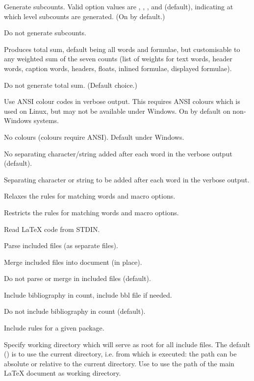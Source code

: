 \begin{description}
\option[-sub\alt{=\ldots}, -subcount\alt{=\ldots}]Generate subcounts. Valid option values are , , ,  and  (default), indicating at which level subcounts are generated. (On by default.)

\option[-nosub]Do not generate subcounts.

\option[-sum\alt{=n,n,\ldots}]Produces total sum, default being all words and formulae, but customisable to any weighted sum of the seven counts (list of weights for text words, header words, caption words, headers, floats, inlined formulae, displayed formulae).

\option[-nosum]Do not generate total sum. (Default choice.)

\option[-col]Use ANSI colour codes in verbose output. This requires ANSI colours which is used on Linux, but may not be available under Windows. On by default on non-Windows systems. 

\option[-nc, -nocol]No colours (colours require ANSI). Default under Windows.

No separating character/string added after each word in the verbose output (default).

\option[-sep=, -separator=]Separating character or string to be added after each word in the verbose output.

\option[-relaxed]Relaxes the rules for matching words and macro options.

\option[-restricted]Restricts the rules for matching words and macro options.

\option[-]Read \LaTeX{} code from STDIN.

\option[-inc]Parse included files (as separate files).

\option[-merge]Merge included files into document (in place).

\option[-noinc]Do not parse or merge in included files (default).

\option[-incbib]Include bibliography in count, include bbl file if needed.

\option[-nobib]Do not include bibliography in count (default).

\option[-incpackage=]Include rules for a given package.

\option[-dir\alt{=\ldots}]Specify working directory which will serve as root for all include files. The default () is to use the current directory, i.e. from which \TeXcount{} is executed: the path can be absolute or relative to the current directory. Use  to use the path of the main \LaTeX{} document as working directory.


\end{description}
